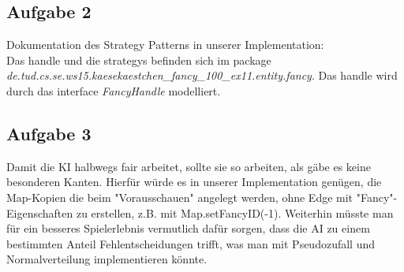 \documentclass[a4paper]{article}
\begin{document}
\subsection*{Aufgabe 2}
Dokumentation des Strategy Patterns in unserer Implementation:\\[1.0cm]
Das handle und die strategys befinden sich im package  \textit{de.tud.cs.se.ws15.kaesekaestchen_fancy_100_ex11.entity.fancy}. Das handle wird durch das interface \textit{FancyHandle} modelliert. 
\subsection*{Aufgabe 3}
	Damit die KI halbwegs fair arbeitet, sollte sie so arbeiten, als gäbe es keine besonderen Kanten. Hierfür würde es in unserer Implementation genügen, die Map-Kopien die beim "Vorausschauen" angelegt werden, ohne Edge mit "Fancy"-Eigenschaften zu erstellen, z.B. mit Map.setFancyID(-1). Weiterhin müsste man für ein besseres Spielerlebnis vermutlich dafür sorgen, dass die AI zu einem bestimmten Anteil Fehlentscheidungen trifft, was man mit Pseudozufall und Normalverteilung implementieren könnte. 
\end{document}
